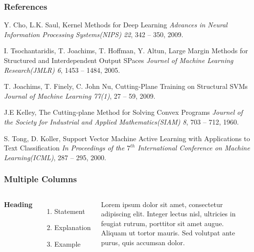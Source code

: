 \documentclass{beamer}
\begin{document}
\begin{frame}
\frametitle{References}
\footnotesize{
\begin{thebibliography}{99} %
 Y. Cho, L.K. Saul, Kernel Methods  for Deep Learning
\newblock \emph{Advances in Neural Information Processing Systems(NIPS) 22}, 342 -- 350, 2009.

 I. Tsochantaridis, T. Joachims, T. Hoffman, Y. Altun, Large Margin Methods for Structured and Interdependent Output SPaces
\newblock \emph{Journel of Machine Learning Research(JMLR) 6}, 1453 -- 1484, 2005.

 T. Joachims, T. Finely, C. John Nu, Cutting-Plane Training on Structural SVMs
\newblock \emph{Journal of Machine Learning 77(1)}, 27 -- 59, 2009.

 J.E Kelley, The Cutting-plane Method for Solving Convex Programs
\newblock \emph{Journel of the Society for Industrial and Applied Mathematics(SIAM) 8}, 703 -- 712, 1960.

 S. Tong, D. Koller, Support Vector Machine Active Learning with Applications to Text Classification
\newblock \emph{In Proceedings of the $7^{th}$ International Conference on Machine Learning(ICML)}, 287 -- 295, 2000.


\end{thebibliography}
}
\end{frame}

\iffalse

\begin{frame}
\frametitle{Multiple Columns}
\begin{columns}[c] %

\textbf{Heading}
\begin{enumerate}
\item Statement
\item Explanation
\item Example
\end{enumerate}

Lorem ipsum dolor sit amet, consectetur adipiscing elit. Integer lectus nisl, ultricies in feugiat rutrum, porttitor sit amet augue. Aliquam ut tortor mauris. Sed volutpat ante purus, quis accumsan dolor.

\end{columns}
\end{frame}
\end{document}
